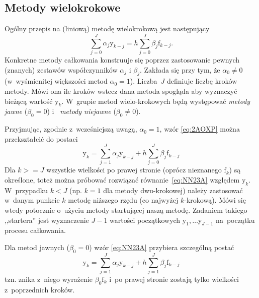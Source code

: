 \documentclass[paper=a4,DIV=12]{lpas}
\newcommand{\brm}[1]{\bm{\mathrm{#1}}}
\begin{document}
\begin{appendices}
\subsection{Metody wielokrokowe}
\label{sec:QS6QT}

Ogólny przepis na (liniową) metodę wielokrokową jest następujący
\begin{equation}
  \sum_{j=0}^J \alpha_j \brm{y}_{k-j} = h \sum_{j=0}^J \beta_j \brm{f}_{k-j}.
  \label{eq:2AOXP}
\end{equation}
Konkretne metody całkowania konstruuje się poprzez zastosowanie pewnych
(znanych) zestawów współczynników $\alpha_j$ i $\beta_j$. Zakłada się przy tym,
że $\alpha_0 \neq 0$ (w~wyśmienitej większości metod $\alpha_0 = 1$).
Liczba~$J$ definiuje liczbę kroków metody. Mówi ona ile kroków wstecz dana
metoda spogląda aby wyznaczyć bieżącą wartość $\brm{y}_k$. W~grupie metod
wielo-krokowych będą występować {\em metody jawne} ($\beta_0 = 0$) i~{\em
metody niejawne} ($\beta_0 \neq 0$).

Przyjmując, zgodnie z~wcześniejszą uwagą, $\alpha_0 = 1$, wzór \eqref{eq:2AOXP}
można przekształcić do postaci
\begin{equation}
  \brm{y}_k = \sum_{j=1}^J \alpha_j \brm{y}_{k-j} + h \sum_{j=0}^J \beta_j \brm{f}_{k-j}
  \label{eq:NN23A}
\end{equation}
Dla $k>=J$ wszystkie wielkości po prawej stronie (oprócz nieznanego
$\brm{f}_k$) są określone, toteż można próbować rozwiązać
równanie~\eqref{eq:NN23A} względem $\brm{y}_k$. W~przypadku $k < J$ (np. $k=1$
dla metody dwu-krokowej) należy zastosować w~danym punkcie $k$ metodę niższego
rzędu (co najwyżej $k$-krokową). Mówi się wtedy potocznie o~użyciu metody
startującej naszą metodę. Zadaniem takiego ,,startera'' jest wyznaczenie $J-1$
wartości początkowych $\brm{y}_1, \dots \brm{y}_{J-1}$ na~początku procesu
całkowania.

Dla metod jawnych ($\beta_0 = 0$) wzór \eqref{eq:NN23A} przybiera szczególną
postać
\begin{equation}
  \brm{y}_k = \sum_{j=1}^J \alpha_j \brm{y}_{k-j} + h \sum_{j=1}^J \beta_j \brm{f}_{k-j}
  \label{eq:EQ0F7}
\end{equation}
tzn. znika z~niego wyrażenie $\beta_0 \brm{f}_k$ i~po prawej stronie zostają
tylko wielkości z~poprzednich kroków.


\end{appendices}
\end{document}
